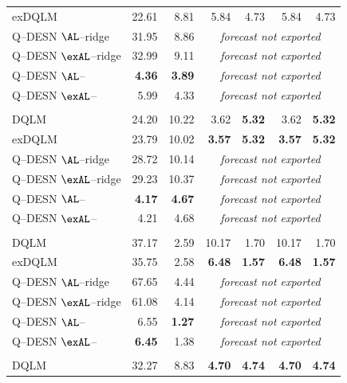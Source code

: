 \begin{longtable}{@{}lrrrrrr@{}}
exDQLM & 22.61 & 8.81 & 5.84 & 4.73 & 5.84 & 4.73 \\
Q--DESN \(\AL\)--ridge & 31.95 & 8.86 & \multicolumn{4}{c}{\emph{forecast not exported}} \\
Q--DESN \(\exAL\)--ridge & 32.99 & 9.11 & \multicolumn{4}{c}{\emph{forecast not exported}} \\
Q--DESN \(\AL\)--\RHS{} & \textbf{4.36} & \textbf{3.89} & \multicolumn{4}{c}{\emph{forecast not exported}} \\
Q--DESN \(\exAL\)--\RHS{} & 5.99 & 4.33 & \multicolumn{4}{c}{\emph{forecast not exported}} \\
\addlinespace[0.25em]
\multicolumn{7}{@{}l}{\emph{Laplace errors, $\tau = 0.50$}}\\
DQLM & 24.20 & 10.22 & 3.62 & \textbf{5.32} & 3.62 & \textbf{5.32} \\
exDQLM & 23.79 & 10.02 & \textbf{3.57} & \textbf{5.32} & \textbf{3.57} & \textbf{5.32} \\
Q--DESN \(\AL\)--ridge & 28.72 & 10.14 & \multicolumn{4}{c}{\emph{forecast not exported}} \\
Q--DESN \(\exAL\)--ridge & 29.23 & 10.37 & \multicolumn{4}{c}{\emph{forecast not exported}} \\
Q--DESN \(\AL\)--\RHS{} & \textbf{4.17} & \textbf{4.67} & \multicolumn{4}{c}{\emph{forecast not exported}} \\
Q--DESN \(\exAL\)--\RHS{} & 4.21 & 4.68 & \multicolumn{4}{c}{\emph{forecast not exported}} \\
\addlinespace[0.25em]
\multicolumn{7}{@{}l}{\emph{Gaussian mixture errors, $\tau = 0.05$}}\\
DQLM & 37.17 & 2.59 & 10.17 & 1.70 & 10.17 & 1.70 \\
exDQLM & 35.75 & 2.58 & \textbf{6.48} & \textbf{1.57} & \textbf{6.48} & \textbf{1.57} \\
Q--DESN \(\AL\)--ridge & 67.65 & 4.44 & \multicolumn{4}{c}{\emph{forecast not exported}} \\
Q--DESN \(\exAL\)--ridge & 61.08 & 4.14 & \multicolumn{4}{c}{\emph{forecast not exported}} \\
Q--DESN \(\AL\)--\RHS{} & 6.55 & \textbf{1.27} & \multicolumn{4}{c}{\emph{forecast not exported}} \\
Q--DESN \(\exAL\)--\RHS{} & \textbf{6.45} & 1.38 & \multicolumn{4}{c}{\emph{forecast not exported}} \\
\addlinespace[0.25em]
\multicolumn{7}{@{}l}{\emph{Gaussian mixture errors, $\tau = 0.25$}}\\
DQLM & 32.27 & 8.83 & \textbf{4.70} & \textbf{4.74} & \textbf{4.70} & \textbf{4.74} \\

\end{longtable}

